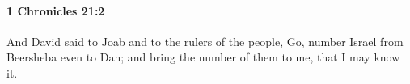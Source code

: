 
		\paragraph{1 Chronicles 21:2} %
			\label{1CHRONICLES-21-2}

			And David said to Joab and to the rulers of the people, Go, number Israel from Beersheba even to Dan; and bring the number of them to me, that I may know it.


